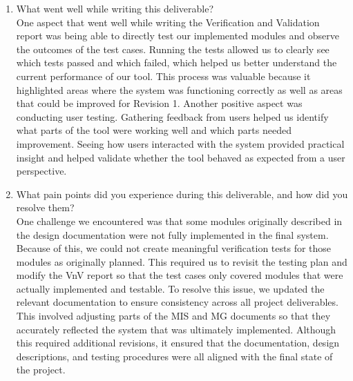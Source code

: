 \documentclass[12pt, titlepage]{article}
\begin{document}
  \begin{enumerate}
    \item What went well while writing this deliverable? \\
      One aspect that went well while writing the Verification and
      Validation report was being able to directly test our
      implemented modules and observe
      the outcomes of the test cases. Running the tests allowed us to
      clearly see which tests passed and which failed, which helped
      us better understand the current
      performance of our tool. This process was valuable because it
      highlighted areas where the system was functioning correctly as
      well as areas that could be improved for Revision 1.
      Another positive aspect was conducting user testing. Gathering
      feedback from users helped us identify what parts of the tool
      were working well and which parts needed improvement.
      Seeing how users interacted with the system provided practical
      insight and helped validate whether the tool behaved as
      expected from a user perspective.

    \item What pain points did you experience during this deliverable, and how
      did you resolve them? \\
      One challenge we encountered was that some modules originally
      described in the design documentation were not fully
      implemented in the final system. Because of this, we could
      not create meaningful verification tests for those modules as
      originally planned. This required us to revisit the testing
      plan and modify the VnV report so that the test
      cases only covered modules that were actually implemented and testable.
      To resolve this issue, we updated the relevant documentation to
      ensure consistency across all project deliverables. This
      involved adjusting parts of the MIS and MG documents so that
      they accurately reflected the system that was ultimately
      implemented. Although this required additional revisions, it
      ensured that the documentation, design descriptions, and testing
      procedures were all aligned with the final state of the project.

  \end{enumerate}

  
\end{document}
